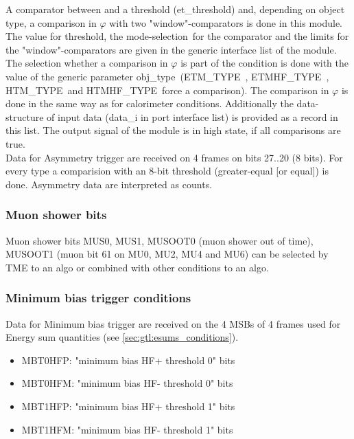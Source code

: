 A comparator between \et and a threshold (et\_threshold) and, depending on object type, a comparison in $\varphi$ with
two "window"-comparators is done in this module.
The value for \et threshold, the \textquotesingle mode-selection\textquotesingle\  for the \et comparator and the limits for the "window"-comparators are given in the generic interface list of the module.
The selection whether a comparison in $\varphi$ is part of the condition is done with the value of the generic parameter \textquotesingle obj\_type\textquotesingle\  
(\textquotesingle ETM\_TYPE\textquotesingle\ , \textquotesingle ETMHF\_TYPE\textquotesingle\ , \textquotesingle HTM\_TYPE\textquotesingle\ and \textquotesingle HTMHF\_TYPE\textquotesingle\ force a comparison).
The comparison in $\varphi$ is done in the same way as for calorimeter conditions.
Additionally the data-structure of input data (data\_i in port interface list) is provided
as a record in this list. The output signal of the module is in high state, if all comparisons are true.\\
Data for Asymmetry trigger are received on 4 frames on bits 27..20 (8 bits). For every type a comparision with an 8-bit threshold (greater-equal [or equal]) is done.
Asymmetry data are interpreted as counts.

\clearpage

\subsubsection{Muon shower bits}
\label{sec:gtl:muon_shower_bits}

Muon shower bits MUS0, MUS1, MUSOOT0 (muon shower out of time), MUSOOT1 (muon bit 61 on MU0, MU2, MU4 and MU6) can be selected by TME to an algo or combined with other conditions to an algo.

\subsubsection{Minimum bias trigger conditions}
\label{sec:gtl:min_bias_conditions}

Data for Minimum bias trigger are received on the 4 MSBs of 4 frames used for Energy sum quantities (see \ref{sec:gtl:esums_conditions}).

\begin{itemize}
\item MBT0HFP: "minimum bias HF+ threshold 0" bits
\item MBT0HFM: "minimum bias HF- threshold 0" bits
\item MBT1HFP: "minimum bias HF+ threshold 1" bits
\item MBT1HFM: "minimum bias HF- threshold 1" bits
\end{itemize}


